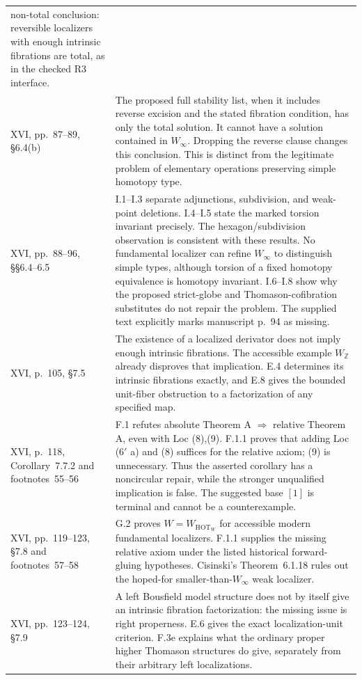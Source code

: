 \begin{longtable}{@{}p{}p{}@{}}
non-total conclusion: reversible localizers with enough intrinsic fibrations
are total, as in the checked R3 interface. \\
XVI, pp.~87--89, \S6.4(b) &
The proposed full stability list, when it includes reverse excision and the
stated fibration condition, has only the total solution. It cannot have a
solution contained in $W_\infty$. Dropping the reverse clause changes this
conclusion. This is distinct from the legitimate problem of elementary
operations preserving simple homotopy type. \\
XVI, pp.~88--96, \S\S6.4--6.5 &
I.1--I.3 separate adjunctions, subdivision, and weak-point deletions. I.4--I.5
state the marked torsion invariant precisely. The hexagon/subdivision
observation is consistent with these results. No fundamental localizer can
refine $W_\infty$ to distinguish simple types, although torsion of a fixed
homotopy equivalence is homotopy invariant. I.6--I.8 show why the proposed
strict-globe and Thomason-cofibration substitutes do not repair the problem.
The supplied text explicitly marks manuscript p.~94 as missing. \\
XVI, p.~105, \S7.5 &
The existence of a localized derivator does not imply enough intrinsic
fibrations. The accessible example $W_{\mathbb Z}$ already disproves that
implication. E.4 determines its intrinsic fibrations exactly, and E.8 gives
the bounded unit-fiber obstruction to a factorization of any specified map. \\
XVI, p.~118, Corollary~7.7.2 and footnotes~55--56 &
F.1 refutes absolute Theorem A $\Rightarrow$ relative Theorem A, even with
Loc (8),(9). F.1.1 proves that adding Loc ($6'$ a) and (8) suffices for the
relative axiom; (9) is unnecessary. Thus the asserted corollary has a
noncircular repair, while the stronger unqualified implication is false.
The suggested base $[1]$ is terminal and cannot be a counterexample. \\
XVI, pp.~119--123, \S7.8 and footnotes~57--58 &
G.2 proves $W=W_{\mathrm{HOT}_W}$ for accessible modern fundamental
localizers. F.1.1 supplies the missing relative axiom under the listed
historical forward-gluing hypotheses. Cisinski's Theorem~6.1.18 rules out
the hoped-for smaller-than-$W_\infty$ weak localizer. \\
XVI, pp.~123--124, \S7.9 &
A left Bousfield model structure does not by itself give an intrinsic
fibration factorization: the missing issue is right properness. E.6 gives
the exact localization-unit criterion. F.3e explains what the ordinary
proper higher Thomason structures do give, separately from their arbitrary
left localizations. \\
\bottomrule
\end{longtable}
\normalsize

